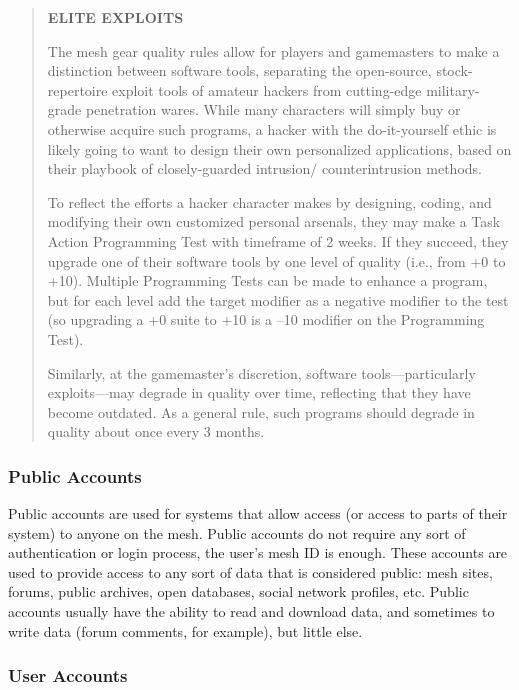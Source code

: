 \begin{quotation}
\textbf{ELITE EXPLOITS}

The mesh gear quality rules allow for players
and gamemasters to make a distinction between
software tools, separating the open-source,
stock-repertoire exploit tools of amateur hackers
from cutting-edge military-grade penetration
wares. While many characters will simply buy or
otherwise acquire such programs, a hacker with
the do-it-yourself ethic is likely going to want
to design their own personalized applications,
based on their playbook of closely-guarded intrusion/
counterintrusion methods.

To reflect the efforts a hacker character makes
by designing, coding, and modifying their own
customized personal arsenals, they may make a
Task Action Programming Test with timeframe
of 2 weeks. If they succeed, they upgrade one
of their software tools by one level of quality
(i.e., from +0 to +10). Multiple Programming
Tests can be made to enhance a program, but for
each level add the target modifier as a negative
modifier to the test (so upgrading a +0 suite to
+10 is a –10 modifier on the Programming Test).

Similarly, at the gamemaster’s discretion, software
tools—particularly exploits—may degrade
in quality over time, reflecting that they have
become outdated. As a general rule, such programs
should degrade in quality about once
every 3 months.
\end{quotation}

\subsubsection{Public Accounts}

Public accounts are used for systems that allow 
access (or access to parts of their system) to anyone 
on the mesh. Public accounts do not require any sort 
of authentication or login process, the user's mesh ID 
is enough. These accounts are used to provide access 
to any sort of data that is considered public: mesh 
sites, forums, public archives, open databases, social 
network profiles, etc. Public accounts usually have 
the ability to read and download data, and sometimes
to write data (forum comments, for example),
but little else.

\subsubsection{User Accounts}

